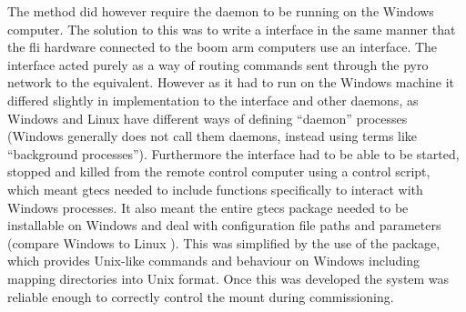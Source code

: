\begin{colsection}
\begin{colsection}
The  method did however require the  daemon to be running on the Windows computer. The solution to this was to write a  interface in the same manner that the \gls{fli} hardware connected to the boom arm computers use an  interface. The  interface acted purely as a way of routing commands sent through the \gls{pyro} network to the  equivalent. However as it had to run on the Windows machine it differed slightly in implementation to the  interface and other daemons, as Windows and Linux have different ways of defining ``daemon'' processes (Windows generally does not call them daemons, instead using terms like ``background processes''). Furthermore the interface had to be able to be started, stopped and killed from the remote control computer using a  control script, which meant \gls{gtecs} needed to include functions specifically to interact with Windows processes. It also meant the entire \gls{gtecs} package needed to be installable on Windows and deal with configuration file paths and parameters (compare Windows  to Linux ). This was simplified by the use of the  package, which provides Unix-like commands and behaviour on Windows including mapping directories into Unix format. Once this was developed the system was reliable enough to correctly control the mount during commissioning.


\end{colsection}
\end{colsection}
